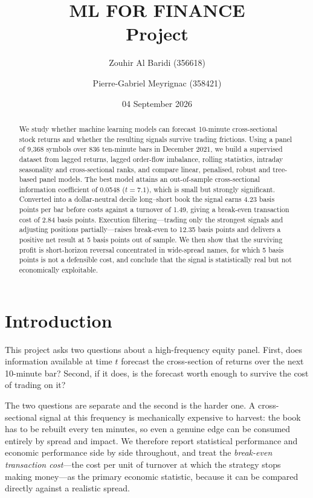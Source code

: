 \documentclass[11pt]{article}
\title{\vspace{-2em}\textbf{\Large ML FOR FINANCE}\\[0.4em]\large Project}
\author{Zouhir Al Baridi (356618) \and Pierre-Gabriel Meyrignac (358421)}
\date{04 September 2026}
\begin{document}
\maketitle
\thispagestyle{empty}

\begin{abstract}
\noindent We study whether machine learning models can forecast 10-minute
cross-sectional stock returns and whether the resulting signals survive
trading frictions. Using a panel of 9,368 symbols over 836
ten-minute bars in December 2021, we build a supervised dataset from lagged
returns, lagged order-flow imbalance, rolling statistics, intraday seasonality
and cross-sectional ranks, and compare linear, penalised, robust and tree-based
panel models. The best model attains an out-of-sample cross-sectional
information coefficient of 0.0548 ($t = 7.1$), which is small but strongly
significant. Converted into a dollar-neutral decile long--short book the signal
earns 4.23 basis points per bar before costs against a turnover of
1.49, giving a break-even transaction cost of 2.84 basis points.
Execution filtering---trading only the strongest signals and adjusting
positions partially---raises break-even to 12.35 basis points and
delivers a positive net result at 5 basis points out of sample. We then show
that the surviving profit is short-horizon reversal concentrated in
wide-spread names, for which 5 basis points is not a defensible cost, and
conclude that the signal is statistically real but not economically
exploitable.
\end{abstract}

\section{Introduction}

This project asks two questions about a high-frequency equity panel. First,
does information available at time $t$ forecast the cross-section of returns
over the next 10-minute bar? Second, if it does, is the forecast worth enough
to survive the cost of trading on it?

The two questions are separate and the second is the harder one. A
cross-sectional signal at this frequency is mechanically expensive to harvest:
the book has to be rebuilt every ten minutes, so even a genuine edge can be
consumed entirely by spread and impact. We therefore report statistical
performance and economic performance side by side throughout, and treat the
\emph{break-even transaction cost}---the cost per unit of turnover at which the
strategy stops making money---as the primary economic statistic, because it can
be compared directly against a realistic spread.
\end{document}
